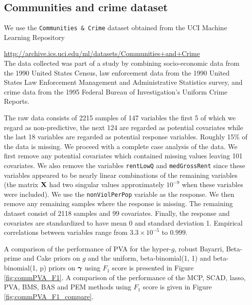 \subsection{Communities and crime dataset}
\label{sec:crime}

We use the {\tt Communities \& Crime} dataset obtained from the UCI Machine
Learning Repository   

\smallskip 

\noindent 
\url{http://archive.ics.uci.edu/ml/datasets/Communities+and+Crime}  \\

\noindent The data collected was part of a study by \cite{Redmond2002}
combining socio-economic data from the 1990 United States Census, law
enforcement data from the 1990 United States Law Enforcement Management and
Administrative Statistics survey, and crime data from the 1995 Federal Bureau
of Investigation's Uniform Crime Reports.

The raw data consists of 2215 samples of 147 variables the first 5 of which we
regard as non-predictive, the next 124 are regarded as potential covariates
while the last 18 variables are regarded as potential response variables.
Roughly 15\% of the data is missing. We proceed with a complete case analysis
of the data.  We first remove any potential covariates which contained missing
values leaving 101 covariates. We also remove the variables {\tt rentLowQ} and
{\tt medGrossRent} since these variables appeared to be nearly linear
combinations of the remaining variables (the matrix ${\bf X}$ had two singular
values approximately $10^{-9}$ when these variables were included).  We use the
{\tt nonViolPerPop} variable as the response. We then remove any remaining
samples where the response is missing. The remaining dataset consist of 2118
samples and 99 covariates. Finally, the response and covariates are
standardized to have mean 0 and standard deviation 1. Empirical correlations
between variables range from $3.3\times10^{-5}$ to $0.999$.

A comparison of the performance of PVA for the hyper-$g$, robust Bayarri,
Beta-prime and Cake priors on $g$ and the uniform, beta-binomial(1, 1) and
beta-binomial(1, p) priors on ${\boldsymbol \gamma}$ using $F_1$ score is presented in
Figure \ref{fig:commPVA_F1}. A comparison of the performance of the MCP, SCAD,
lasso, PVA, BMS, BAS and PEM  methods using $F_1$ score is given in Figure
\ref{fig:commPVA_F1_compare}.

